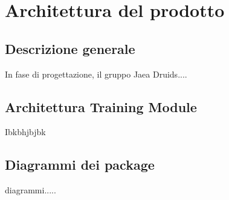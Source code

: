 \chapter{Architettura del prodotto}

\section{Descrizione generale}
In fase di progettazione, il gruppo Jaea Druids.... 
\section{Architettura Training Module}
Ibkbhjbjbk
\section{Diagrammi dei package}
diagrammi.....
